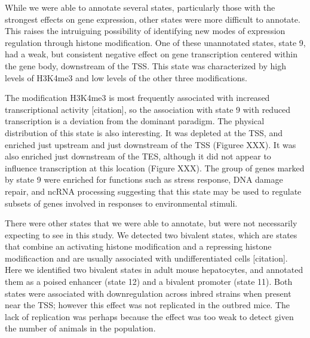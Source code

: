 \documentclass[10pt,letterpaper]{article}
\begin{document}
While we were able to annotate several states, particularly those with
the strongest effects on gene expression, other states were more
difficult to annotate. This raises the intruiguing possibility of
identifying new modes of expression regulation through histone
modification. One of these unannotated states, state 9, had a weak, but
consistent negative effect on gene transcription centered within the
gene body, downstream of the TSS. This state was characterized by high
levels of H3K4me3 and low levels of the other three modifications.

The modification H3K4me3 is most frequently associated with increased
transcriptional activity {[}citation{]}, so the association with state 9
with reduced transcription is a deviation from the dominant paradigm.
The physical distribution of this state is also interesting. It was
depleted at the TSS, and enriched just upstream and just downstream of
the TSS (Figuree XXX). It was also enriched just downstream of the TES,
although it did not appear to influence transcription at this location
(Figure XXX). The group of genes marked by state 9 were enriched for
functions such as stress response, DNA damage repair, and ncRNA
processing suggesting that this state may be used to regulate subsets of
genes involved in responses to environmental stimuli.

There were other states that we were able to annotate, but were not
necessarily expecting to see in this study. We detected two bivalent
states, which are states that combine an activating histone modification
and a repressing histone modificaction and are usually associated with
undifferentiated cells {[}citation{]}. Here we identified two bivalent
states in adult mouse hepatocytes, and annotated them as a poised
enhancer (state 12) and a bivalent promoter (state 11). Both states were
associated with downregulation across inbred strains when present near
the TSS; however this effect was not replicated in the outbred mice. The
lack of replication was perhaps because the effect was too weak to
detect given the number of animals in the population.
\end{document}
